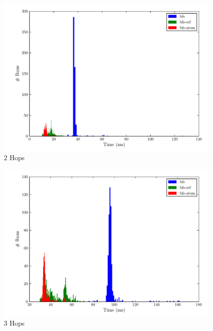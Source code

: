 \documentclass[12pt,letterpaper,oneside,notitlepage]{report}
\theoremstyle{definition}
\begin{document}
    \begin{figure}[!ht]
      \centering
      \includegraphics[scale=0.85]{2_hops}
      \caption{2 Hops}
      \label{fig:perf-2-hops}
    \end{figure}
    
    \begin{figure}[!ht]
      \centering
      \includegraphics[scale=0.85]{3_hops}
      \caption{3 Hops}
      \label{fig:perf-3-hops}
    \end{figure}
    
\end{document}
